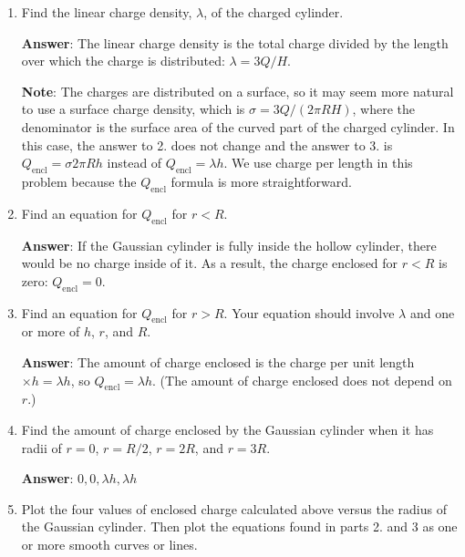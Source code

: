 \documentclass{article}
\begin{document}
\begin{enumerate}

  \item Find the linear charge density, $\lambda$, of the charged cylinder.

        \ifsolutions
        {\bf Answer}: The linear charge density is the total charge divided by the length over which the charge is distributed: $\lambda={3Q}/{H}$.

        {\bf Note}: The charges are distributed on a surface, so it may seem more natural to use a surface charge density, which is $\sigma = 3Q/(2\pi R H)$, where the denominator is the surface area of the curved part of the charged cylinder. In this case, the answer to 2. does not change and the answer to 3. is $Q_{\text{encl}} = \sigma 2\pi R h$ instead of $Q_{\text{encl}}=\lambda h$. We use charge per length in this problem because the $Q_{\text{encl}}$ formula is more straightforward.
        \fi

        \ifsolutions\else
        \vskip 36pt
        \fi

  \item Find an equation for $Q_{\text{encl}}$ for $r<R$.

        \ifsolutions
        {\bf Answer}: If the Gaussian cylinder is fully inside the hollow cylinder, there would be no charge inside of it. As a result, the charge enclosed for $r< R$ is zero: $Q_{\text{encl}}=0$.
        \fi

        \ifsolutions\else
        \vskip 36pt
        \fi

  \item Find an equation for $Q_{\text{encl}}$ for $r>R$. Your equation should involve $\lambda$ and one or more of $h$, $r$, and $R$.

        \ifsolutions
        {\bf Answer}: The amount of charge enclosed is the charge per unit length $\times h = \lambda h$, so  $Q_{\text{encl}}=\lambda h$. (The amount of charge enclosed does not depend on $r$.)
        \fi

        \ifsolutions\else
        \vskip 36pt
        \fi

  \item Find the amount of charge enclosed by the Gaussian cylinder when it has radii of $r=0$, $r=R/2$, $r=2R$, and $r=3R$.

        \ifsolutions
        {\bf Answer}: $0, 0, \lambda h, \lambda h$
        \fi

        \ifsolutions\else
        \vskip 36pt
        \fi

  \item Plot the four values of enclosed charge calculated above versus the radius of the Gaussian cylinder. Then plot the equations found in parts 2. and 3 as one or more smooth curves or lines.

        \ifsolutions
        
        \fi

\end{enumerate}
\end{document}
